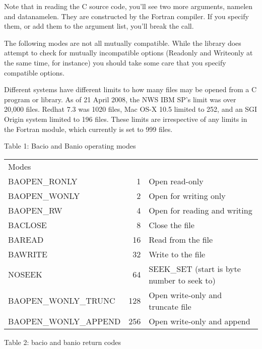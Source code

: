 \documentclass[11pt]{article}
\begin{document}
  Note that in reading the C source code, you'll see two more 
arguments, namelen and datanamelen.  They are constructed by the 
Fortran compiler.  If you specify them, or add them to the argument 
list, you'll break the call.
 
  The following modes are not all mutually compatible.  While the 
library does attempt to check for mutually incompatible options (Readonly 
and Writeonly at the same time, for instance) you should take some care 
that you specify compatible options.  

  Different systems have different limits to how many files may be 
opened from a C program or library.  As of 21 April 2008, the NWS IBM 
SP's limit was over 20,000 files.  Redhat 7.3 was 1020 files, Mac OS-X 
10.5 limited to 252, and an SGI Origin system limited to 196 files.  
These limits are irrespective of any limits in the Fortran module, 
which currently is set to 999 files.

Table 1: Bacio and Banio operating modes

\begin{tabular}{lrl}
Modes & &\\
BAOPEN\_RONLY         &     1 & Open read-only \\
BAOPEN\_WONLY         &     2 & Open for writing only \\
BAOPEN\_RW            &     4 & Open for reading and writing \\
BACLOSE               &    8 & Close the file \\
BAREAD                &   16 & Read from the file \\
BAWRITE               &   32 & Write to the file \\
NOSEEK                &   64 & SEEK\_SET (start is byte number to seek to)\\
BAOPEN\_WONLY\_TRUNC  &    128 & Open write-only and truncate file \\
BAOPEN\_WONLY\_APPEND &    256 & Open write-only and append \\
\end{tabular}


Table 2: bacio and banio return codes
\end{document}
